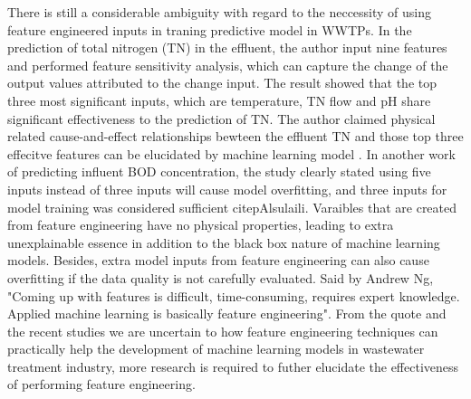 There is still a considerable ambiguity with regard to the neccessity of using feature engineered inputs in traning predictive model in WWTPs. In the prediction of total nitrogen (TN) in the effluent, the author input nine features and performed feature sensitivity analysis, which can capture the change of the output values attributed to the change input. The result showed that the top three most significant inputs, which are temperature, TN flow and pH share significant effectiveness to the prediction of TN. The author claimed physical related cause-and-effect relationships bewteen the effluent TN and those top three effecitve features can be elucidated by machine learning model \citep{guoPredictionEffluentConcentration2015}. In another work of predicting influent BOD concentration, the study clearly stated using five inputs instead of three inputs will cause model overfitting, and three inputs for model training was considered sufficient citep{Alsulaili}. Varaibles that are created from feature engineering have no physical properties, leading to extra unexplainable essence in addition to the black box nature of machine learning models. Besides, extra model inputs from feature engineering can also cause overfitting if the data quality is not carefully evaluated. Said by Andrew Ng, "Coming up with features is difficult, time-consuming, requires expert knowledge. Applied machine learning is basically feature engineering". From the quote and the recent studies we are uncertain to how feature engineering techniques can practically help the development of machine learning models in wastewater treatment industry, more research is required to futher elucidate the effectiveness of performing feature engineering.